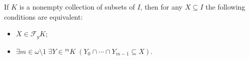 If $K$ is a nonempty collection of subsets of $I$, then for any $X \subseteq I$ the following conditions are equivalent:
\begin{itemize}
\item[(i)] $X \in \mathcal{F}_g K$;
\item[(ii)] $\exists m \in \omega \setminus 1 \; \exists Y \in {}^m K \; (Y_0 \cap \cdots \cap Y_{m-1} \subseteq X)$.
\end{itemize}
